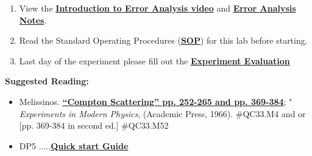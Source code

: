 \documentclass{../lab}
\begin{document}
\begin{enumerate}
    \item View the \href{\ErrorAnalysisVideo}{\textbf{Introduction to Error Analysis video}} and \href{\ErrorAnalysisNotes}{\textbf{\textbf{Error Analysis Notes}}}.

    \item Read the Standard Operating Procedures (\href{http://experimentationlab.berkeley.edu/sites/default/files/images/SOP\_3271\_Cs-137\_Na-22\_Co-60\_Mn-54\_Am-241\_Fe-55\_2014.pdf}{\textbf{SOP}}) for this lab before starting.

    \item Last day of the experiment please fill out the \href{\ExperimentEvaluation}{\textbf{Experiment Evaluation}}

\end{enumerate}

\textbf{Suggested Reading:}

\begin{itemize}
    \item Melissinos. \href{http://physics111.lib.berkeley.edu/Physics111/Reprints/COM/Melissinos\%201966\%20pg\%20252-265\%20and\%20369-384.pdf}{\textbf{``Compton Scattering'' pp. 252-265 and pp. 369-384}}; " \emph{Experiments in Modern Physics}, (Academic Press, 1966). \#QC33.M4 and or [pp. 369-384 in second ed.] \#QC33.M52

    \item DP5 .....\href{http://experimentationlab.berkeley.edu/sites/default/files/images/DP5\_Quick\_Start-Guide\_B0.pdf}{\textbf{Quick start Guide}}

\end{itemize}
\end{document}
